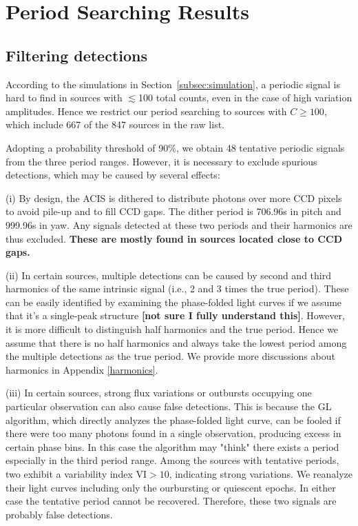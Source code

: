 \documentclass[twoside,twocolumn]{aastex63}
\begin{document}
\section{Period Searching Results}\label{sec:results}
\subsection{Filtering detections}
According to the simulations in Section~\ref{subsec:simulation}, a periodic signal is hard to find in sources with $\lesssim$100 total counts, even in the case of high variation amplitudes.  
Hence we restrict our period searching to sources with $C \geq 100$, which include 667 of the 847 sources in the raw list.

Adopting a probability threshold of 90\%, we obtain 48 tentative periodic signals from the three period ranges. However, it is necessary to exclude spurious detections, which may be caused by several effects:

(i) By design, the ACIS is dithered to distribute photons over more CCD pixels to avoid pile-up and to fill CCD gaps.  The dither period is 706.96s in pitch and 999.96s in yaw. Any signals detected at these two periods and their harmonics are thus excluded. {\bf These are mostly found in sources located close to CCD gaps.} 

(ii) In certain sources, multiple detections can be caused by second and third harmonics of the same intrinsic signal (i.e., 2 and 3 times the true period). These can be easily identified by examining the phase-folded light curves if we assume that it's a single-peak structure {\bf [not sure I fully understand this]}. However, it is more difficult to distinguish half harmonics and the true period. Hence we assume that there is no half harmonics and always take the lowest period among the multiple detections as the true period. We provide more  discussions about harmonics in Appendix \ref{harmonics}. 

(iii) In certain sources, strong flux variations or outbursts occupying one particular observation can also cause false detections. This is because the GL algorithm, which directly analyzes the phase-folded light curve, can be fooled if there were too many photons found in a single observation, producing excess in certain phase bins. In this case the algorithm may "think" there exists a period especially in the third period range. Among the sources with tentative periods, two exhibit a variability index VI$>10$, indicating strong variations. We reanalyze their light curves including only the ourbursting or quiescent epochs. In either case the tentative period cannot be recovered. 
Therefore, these two signals are probably false detections.
\end{document}
